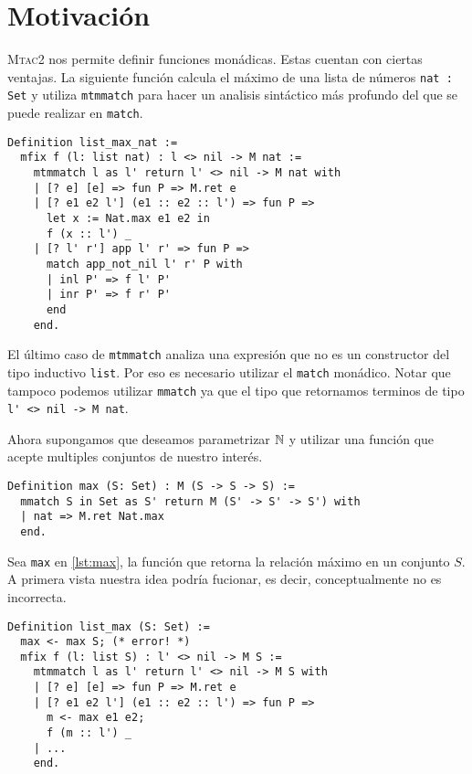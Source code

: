 \chapter{Motivación}\label{ch:motivacion}

\textsc{Mtac2} nos permite definir funciones monádicas. Estas cuentan con ciertas ventajas.
La siguiente función calcula el máximo de una lista de números \lstinline{nat : Set} y utiliza \lstinline{mtmmatch} para hacer un analisis sintáctico más profundo del que se puede realizar en \lstinline{match}. %

\begin{lstlisting}[frame=tb,caption={Función \lstinline{list_max_nat}},label=lst:list_max_nat]
Definition list_max_nat :=
  mfix f (l: list nat) : l <> nil -> M nat :=
    mtmmatch l as l' return l' <> nil -> M nat with
    | [? e] [e] => fun P => M.ret e
    | [? e1 e2 l'] (e1 :: e2 :: l') => fun P =>
      let x := Nat.max e1 e2 in
      f (x :: l') _
    | [? l' r'] app l' r' => fun P =>
      match app_not_nil l' r' P with
      | inl P' => f l' P'
      | inr P' => f r' P'
      end
    end.
\end{lstlisting}

El último caso de \lstinline{mtmmatch} analiza una expresión que no es un constructor del tipo inductivo \lstinline{list}. Por eso es necesario utilizar el \lstinline{match} monádico.
Notar que tampoco podemos utilizar \lstinline{mmatch} ya que el tipo que retornamos terminos de tipo \lstinline{l' <> nil -> M nat}.

Ahora supongamos que deseamos parametrizar $\mathbb{N}$ y utilizar una función que acepte multiples conjuntos de nuestro interés.

\begin{lstlisting}[frame=tb,caption={Función \lstinline{max}},label=lst:max]
Definition max (S: Set) : M (S -> S -> S) :=
  mmatch S in Set as S' return M (S' -> S' -> S') with
  | nat => M.ret Nat.max
  end.
\end{lstlisting}

Sea \lstinline{max} en \ref{lst:max}, la función que retorna la relación máximo en un conjunto $S$.
A primera vista nuestra idea podría fucionar, es decir, conceptualmente no es incorrecta.

\begin{lstlisting}[frame=tb,caption={Función \lstinline{list_max}},label=lst:list_max]
Definition list_max (S: Set) :=
  max <- max S; (* error! *)
  mfix f (l: list S) : l' <> nil -> M S :=
    mtmmatch l as l' return l' <> nil -> M S with
    | [? e] [e] => fun P => M.ret e
    | [? e1 e2 l'] (e1 :: e2 :: l') => fun P =>
      m <- max e1 e2;
      f (m :: l') _
    | ...
    end.
\end{lstlisting}

